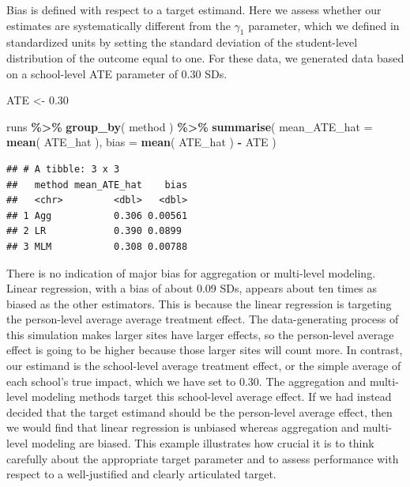 \documentclass[
]{book}
\newenvironment{Shaded}{\begin{snugshade}}{\end{snugshade}}
\newcommand{\AttributeTok}[1]{\textcolor[rgb]{0.13,0.29,0.53}{#1}}
\newcommand{\FloatTok}[1]{\textcolor[rgb]{0.00,0.00,0.81}{#1}}
\newcommand{\FunctionTok}[1]{\textcolor[rgb]{0.13,0.29,0.53}{\textbf{#1}}}
\newcommand{\NormalTok}[1]{#1}
\newcommand{\OtherTok}[1]{\textcolor[rgb]{0.56,0.35,0.01}{#1}}
\newcommand{\SpecialCharTok}[1]{\textcolor[rgb]{0.81,0.36,0.00}{\textbf{#1}}}
\begin{document}
Bias is defined with respect to a target estimand.
Here we assess whether our estimates are systematically different from the \(\gamma_1\) parameter, which we defined in standardized units by setting the standard deviation of the student-level distribution of the outcome equal to one.
For these data, we generated data based on a school-level ATE parameter of 0.30 SDs.

\begin{Shaded}
\begin{Highlighting}[]
\NormalTok{ATE }\OtherTok{\textless{}{-}} \FloatTok{0.30}

\NormalTok{runs }\SpecialCharTok{\%\textgreater{}\%} 
  \FunctionTok{group\_by}\NormalTok{( method ) }\SpecialCharTok{\%\textgreater{}\%}
  \FunctionTok{summarise}\NormalTok{( }
    \AttributeTok{mean\_ATE\_hat =} \FunctionTok{mean}\NormalTok{( ATE\_hat ),}
    \AttributeTok{bias =} \FunctionTok{mean}\NormalTok{( ATE\_hat ) }\SpecialCharTok{{-}}\NormalTok{ ATE}
\NormalTok{  )}
\end{Highlighting}
\end{Shaded}

\begin{verbatim}
## # A tibble: 3 x 3
##   method mean_ATE_hat    bias
##   <chr>         <dbl>   <dbl>
## 1 Agg           0.306 0.00561
## 2 LR            0.390 0.0899 
## 3 MLM           0.308 0.00788
\end{verbatim}

There is no indication of major bias for aggregation or multi-level modeling.
Linear regression, with a bias of about 0.09 SDs, appears about ten times as biased as the other estimators.
This is because the linear regression is targeting the person-level average average treatment effect.
The data-generating process of this simulation makes larger sites have larger effects, so the person-level average effect is going to be higher because those larger sites will count more.
In contrast, our estimand is the school-level average treatment effect, or the simple average of each school's true impact, which we have set to 0.30.
The aggregation and multi-level modeling methods target this school-level average effect.
If we had instead decided that the target estimand should be the person-level average effect, then we would find that linear regression is unbiased whereas aggregation and multi-level modeling are biased.
This example illustrates how crucial it is to think carefully about the appropriate target parameter and to assess performance with respect to a well-justified and clearly articulated target.
\end{document}
